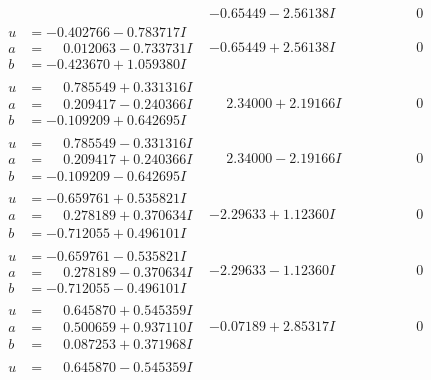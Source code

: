 \documentclass[1p]{elsarticle_modified}
\theoremstyle{definition}
\begin{document}
$$\begin{array}{c|c|c}
 & -0.65449 - 2.56138 I & \phantom{-0.000000 } 0 \\ \hline\begin{aligned}
u &= -0.402766 - 0.783717 I \\
a &= \phantom{-}0.012063 - 0.733731 I \\
b &= -0.423670 + 1.059380 I\end{aligned}
 & -0.65449 + 2.56138 I & \phantom{-0.000000 } 0 \\ \hline\begin{aligned}
u &= \phantom{-}0.785549 + 0.331316 I \\
a &= \phantom{-}0.209417 - 0.240366 I \\
b &= -0.109209 + 0.642695 I\end{aligned}
 & \phantom{-}2.34000 + 2.19166 I & \phantom{-0.000000 } 0 \\ \hline\begin{aligned}
u &= \phantom{-}0.785549 - 0.331316 I \\
a &= \phantom{-}0.209417 + 0.240366 I \\
b &= -0.109209 - 0.642695 I\end{aligned}
 & \phantom{-}2.34000 - 2.19166 I & \phantom{-0.000000 } 0 \\ \hline\begin{aligned}
u &= -0.659761 + 0.535821 I \\
a &= \phantom{-}0.278189 + 0.370634 I \\
b &= -0.712055 + 0.496101 I\end{aligned}
 & -2.29633 + 1.12360 I & \phantom{-0.000000 } 0 \\ \hline\begin{aligned}
u &= -0.659761 - 0.535821 I \\
a &= \phantom{-}0.278189 - 0.370634 I \\
b &= -0.712055 - 0.496101 I\end{aligned}
 & -2.29633 - 1.12360 I & \phantom{-0.000000 } 0 \\ \hline\begin{aligned}
u &= \phantom{-}0.645870 + 0.545359 I \\
a &= \phantom{-}0.500659 + 0.937110 I \\
b &= \phantom{-}0.087253 + 0.371968 I\end{aligned}
 & -0.07189 + 2.85317 I & \phantom{-0.000000 } 0 \\ \hline\begin{aligned}
u &= \phantom{-}0.645870 - 0.545359 I \\

\end{aligned}
\end{array}$$
\end{document}
